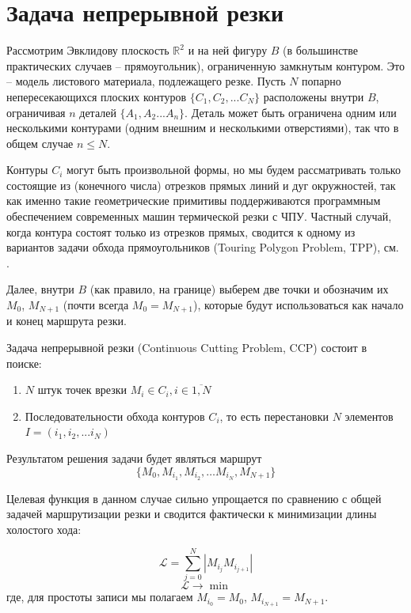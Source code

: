 \documentclass[10pt]{SPIIRAS_Proceedings}
\begin{document}
\section{Задача непрерывной резки}

Рассмотрим Эвклидову плоскость
$\mathbb R ^ 2$
и на ней фигуру
$B$
(в большинстве практических случаев -- прямоугольник),
ограниченную замкнутым контуром.
Это -- модель листового материала,
подлежащего резке.
Пусть
$N$
попарно непересекающихся плоских контуров
$\{C_1, C_2, ... C_N\}$
расположены внутри
$B$,
ограничивая
$n$
деталей
$\{A_1, A_2 ... A_n\}$.
Деталь может быть ограничена
одним или несколькими контурами
(одним внешним и несколькими отверстиями),
так что в общем случае
$n \leqslant N$.

Контуры
$C_i$
могут быть произвольной формы,
но мы будем рассматривать только
состоящие из
(конечного числа)
отрезков прямых линий и дуг окружностей,
так как именно такие геометрические примитивы
поддерживаются программным обеспечением
современных машин термической резки с ЧПУ.
Частный случай,
когда контура состоят только
из отрезков прямых,
сводится к одному из вариантов
задачи обхода прямоугольников
(Touring Polygon Problem, TPP),
см.
\cite{bi13}.

Далее,
внутри
$B$
(как правило, на границе)
выберем две точки и обозначим их
$M_0$, $M_{N + 1}$
(почти всегда $M_0 = M_{N + 1}$),
которые будут использоваться
как начало и конец
маршрута резки.

Задача непрерывной резки
(Continuous Cutting Problem, CCP)
состоит в поиске:
\begin{enumerate}
\item
$N$ штук точек врезки $M_i \in C_i, i \in \overline{1, N}$
\item
Последовательности обхода контуров
$C_i$,
то есть перестановки
$N$
элементов
$I = (i_1, i_2, ... i_N)$
\end{enumerate}

Результатом решения задачи будет являться маршрут
\begin{equation}
  \{M_0, M_{i_1}, M_{i_2}, \dots M_{i_N}, M_{N + 1}\}
\end{equation}

Целевая функция в данном случае сильно упрощается
по сравнению с общей задачей маршрутизации резки
и сводится фактически к минимизации длины холостого хода:

\begin{equation}
  \mathcal{L} = \sum_{j=0}^N|M_{i_j}M_{i_{j+1}}|
  \label{air-move-length}
\end{equation}
$$
\mathcal{L} \to \min
$$
где, для простоты записи мы полагаем
$M_{i_0} = M_0$,
$M_{i_{N + 1}} = M_{N + 1}$.
\end{document}
